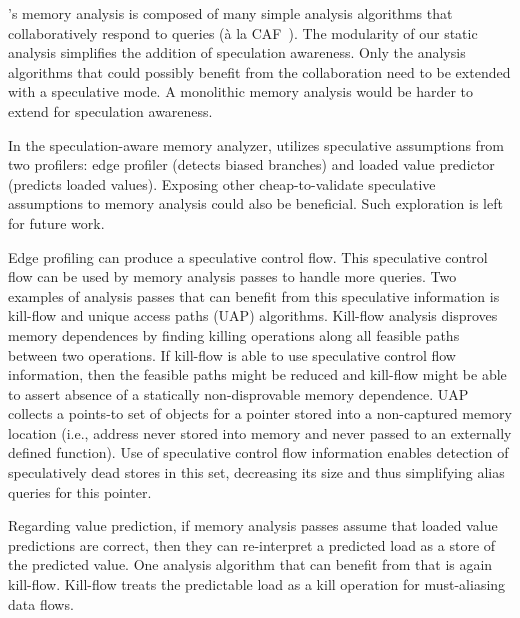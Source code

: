 \name's memory analysis is composed of many simple analysis algorithms
that collaboratively respond to queries (\`{a} la
CAF~\cite{johnson:cgo:17}).
%
The modularity of our static analysis simplifies the addition of
speculation awareness. Only the analysis algorithms that could
possibly benefit from the collaboration need to be extended with a
speculative mode.
%
A monolithic memory analysis would be harder to extend for speculation
awareness.

In the speculation-aware memory analyzer, \name utilizes speculative
assumptions from two profilers: edge profiler (detects biased
branches) and loaded value predictor (predicts loaded values).
%
Exposing other cheap-to-validate speculative assumptions to memory
analysis could also be beneficial.  Such exploration is left for
future work.

Edge profiling can produce a speculative control flow. This
speculative control flow can be used by memory analysis passes to
handle more queries.
%
Two examples of analysis passes that can benefit from this speculative
information is kill-flow and unique access paths (UAP) algorithms.
%
Kill-flow analysis disproves memory dependences by finding killing
operations along all feasible paths between two operations.  If
kill-flow is able to use speculative control flow information, then
the feasible paths might be reduced and kill-flow might be able to
assert absence of a statically non-disprovable memory dependence.
%
UAP collects a points-to set of objects for a pointer stored into a
non-captured memory location (i.e., address never stored into memory
and never passed to an externally defined function).
Use of speculative control flow information enables detection of
speculatively dead stores in this set, decreasing its size and thus
simplifying alias queries for this pointer.


Regarding value prediction, if memory analysis passes assume that
loaded value predictions are correct, then they can re-interpret a
predicted load as a store of the predicted value. One analysis
algorithm that can benefit from that is again kill-flow. Kill-flow
treats the predictable load as a kill operation for must-aliasing data
flows.

